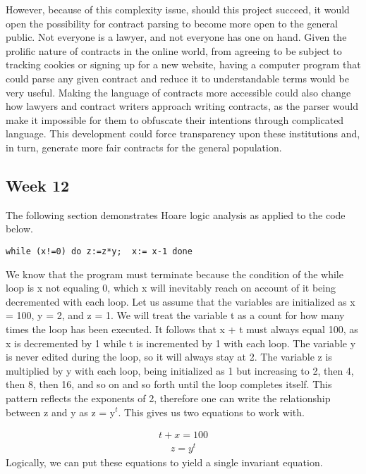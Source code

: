 \documentclass{article}
\theoremstyle{theorem}
\theoremstyle{definition}
\theoremstyle{remark}
\begin{document}
\medskip\noindent
However, because of this complexity issue, should this project succeed, it would open the possibility for contract parsing to become more open to the general public. Not everyone is a lawyer, and not everyone has one on hand. Given the prolific nature of contracts in the online world, from agreeing to be subject to tracking cookies or signing up for a new website, having a computer program that could parse any given contract and reduce it to understandable terms would be very useful. Making the language of contracts more accessible could also change how lawyers and contract writers approach writing contracts, as the parser would make it impossible for them to obfuscate their intentions through complicated language. This development could force transparency upon these institutions and, in turn, generate more fair contracts for the general population.

\subsection{Week 12}
The following section demonstrates Hoare logic analysis as applied to the code below.

\begin{lstlisting}
while (x!=0) do z:=z*y;  x:= x-1 done
\end{lstlisting}
%
We know that the program must terminate because the condition of the while loop is x not equaling 0, which x will inevitably reach on account of it being decremented with each loop. Let us assume that the variables are initialized as x = 100, y = 2, and z = 1. We will treat the variable t as a count for how many times the loop has been executed. It follows that x + t must always equal 100, as x is decremented by 1 while t is incremented by 1 with each loop. The variable y is never edited during the loop, so it will always stay at 2. The variable z is multiplied by y with each loop, being initialized as 1 but increasing to 2, then 4, then 8, then 16, and so on and so forth until the loop completes itself. This pattern reflects the exponents of 2, therefore one can write the relationship between z and y as z = y$^t$. This gives us two equations to work with.

\begin{align*}
t + x = 100
\end{align*}
\begin{align*}
z = y^t
\end{align*}
%
Logically, we can put these equations to yield a single invariant equation.
\end{document}
